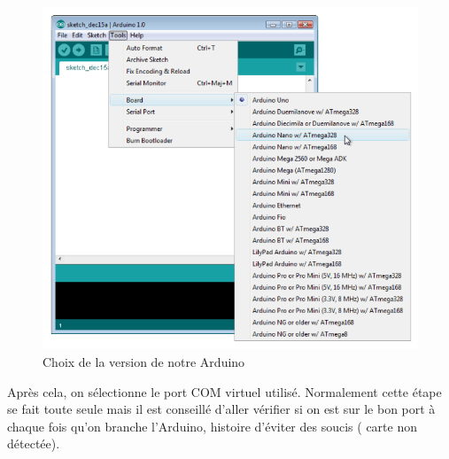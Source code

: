 \documentclass[12pt,a4paper]{article}
\begin{document}
\begin{figure}[h!]
    \centering
    \includegraphics[scale=1.1]{choixcarte.PNG}
    \caption{Choix de la version de notre Arduino}
    \label{fig:my_label}
\end{figure}

\newpage
Après cela, on sélectionne le port COM virtuel utilisé. Normalement cette étape se fait toute seule mais il est conseillé d’aller vérifier si on est sur le bon port à chaque fois qu’on branche l’Arduino, histoire d’éviter des soucis ( carte non détectée).
\end{document}
